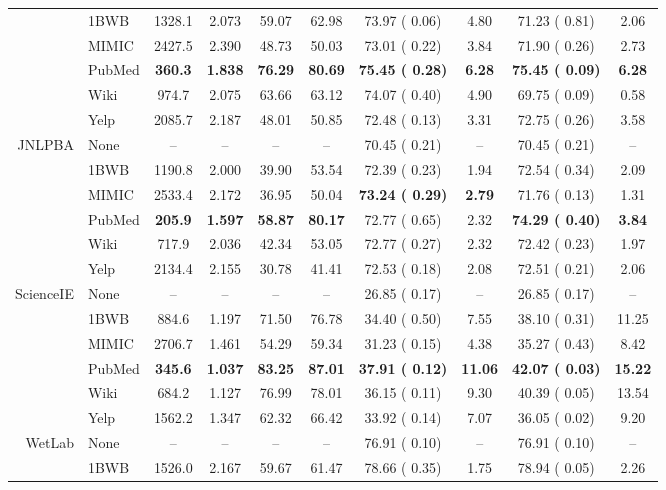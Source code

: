 \documentclass[11pt,a4paper]{article}
\begin{document}
\begin{table*}[ht!]
\begin{small}
\begin{center}
\begin{tabular}{r l | c c c c | c c | c c }
 & 1BWB & 1328.1 & 2.073 & 59.07 & 62.98 & 73.97 ( 0.06) & 4.80 & 71.23 ( 0.81) & 2.06 \\
 & MIMIC & 2427.5 & 2.390 & 48.73 & 50.03 & 73.01 ( 0.22) & 3.84 & 71.90 ( 0.26) & 2.73 \\
 & PubMed & \bf \phantom{0}360.3 & \bf 1.838 & \bf 76.29 & \bf 80.69 & \bf 75.45 ( 0.28) & \bf 6.28 & \bf 75.45 ( 0.09) & \bf 6.28 \\
 & Wiki & \phantom{0}974.7 & 2.075 & 63.66 & 63.12 & 74.07 ( 0.40) & 4.90 & 69.75 ( 0.09) & 0.58 \\
 & Yelp & 2085.7 & 2.187 & 48.01 & 50.85 & 72.48 ( 0.13) & 3.31 & 72.75 ( 0.26) & 3.58 \\
\midrule
\multirow{6}{*}{JNLPBA} & None & -- & -- & -- & -- & 70.45 ( 0.21) & -- & 70.45 ( 0.21) & -- \\ 
 & 1BWB & 1190.8 & 2.000 & 39.90 & 53.54 & 72.39 ( 0.23) & 1.94 & 72.54 ( 0.34) & 2.09 \\
 & MIMIC & 2533.4 & 2.172 & 36.95 & 50.04 & \bf 73.24 ( 0.29) & \bf 2.79 & 71.76 ( 0.13) & 1.31 \\
 & PubMed & \bf \phantom{0}205.9 & \bf 1.597 & \bf 58.87 & \bf 80.17 & 72.77 ( 0.65) & 2.32 & \bf 74.29 ( 0.40) & \bf 3.84 \\
 & Wiki & \phantom{0}717.9 & 2.036 & 42.34 & 53.05 & 72.77 ( 0.27) & 2.32 & 72.42 ( 0.23) & 1.97 \\
 & Yelp & 2134.4 & 2.155 & 30.78 & 41.41 & 72.53 ( 0.18) & 2.08 & 72.51 ( 0.21) & 2.06 \\
\midrule
\multirow{6}{*}{ScienceIE} & None & -- & -- & -- & -- & 26.85 ( 0.17) & -- & 26.85 ( 0.17) & -- \\ 
 & 1BWB & \phantom{0}884.6 & 1.197 & 71.50 & 76.78 & 34.40 ( 0.50) & 7.55 & 38.10 ( 0.31) & 11.25 \\
 & MIMIC & 2706.7 & 1.461 & 54.29 & 59.34 & 31.23 ( 0.15) & 4.38 & 35.27 ( 0.43) & 8.42 \\
 & PubMed & \bf \phantom{0}345.6 & \bf 1.037 & \bf 83.25 & \bf 87.01 & \bf 37.91 ( 0.12) & \bf 11.06 & \bf 42.07 ( 0.03) & \bf 15.22 \\
 & Wiki & \phantom{0}684.2 & 1.127 & 76.99 & 78.01 & 36.15 ( 0.11) & 9.30 & 40.39 ( 0.05) & 13.54 \\
 & Yelp & 1562.2 & 1.347 & 62.32 & 66.42 & 33.92 ( 0.14) & 7.07 & 36.05 ( 0.02) & 9.20 \\
\midrule
\multirow{6}{*}{WetLab} & None & -- & -- & -- & -- & 76.91 ( 0.10) & -- & 76.91 ( 0.10) & -- \\ 
 & 1BWB & 1526.0 & 2.167 & 59.67 & 61.47 & 78.66 ( 0.35) & 1.75 & 78.94 ( 0.05) & 2.26 \\

\end{tabular}
\end{center}
\end{small}
\end{table*}
\end{document}
